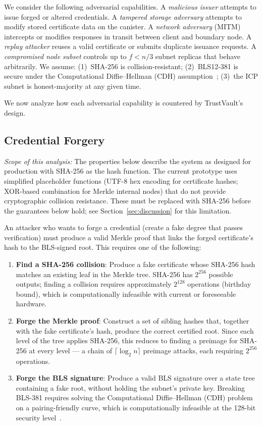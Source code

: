 \documentclass[journal]{IEEEtran}
\begin{document}
We consider the following adversarial capabilities. A \emph{malicious issuer} attempts to issue forged or altered credentials. A \emph{tampered storage adversary} attempts to modify stored certificate data on the canister. A \emph{network adversary} (MITM) intercepts or modifies responses in transit between client and boundary node. A \emph{replay attacker} reuses a valid certificate or submits duplicate issuance requests. A \emph{compromised node subset} controls up to $f < n/3$ subnet replicas that behave arbitrarily. We assume: (1)~SHA-256 is collision-resistant; (2)~BLS12-381 is secure under the Computational Diffie--Hellman (CDH) assumption~\cite{boneh2001bls}; (3)~the ICP subnet is honest-majority at any given time.

We now analyze how each adversarial capability is countered by TrustVault's design.

\subsection{Credential Forgery}

\textit{Scope of this analysis:} The properties below describe the system as designed for production with SHA-256 as the hash function. The current prototype uses simplified placeholder functions (UTF-8 hex encoding for certificate hashes; XOR-based combination for Merkle internal nodes) that do not provide cryptographic collision resistance. These must be replaced with SHA-256 before the guarantees below hold; see Section~\ref{sec:discussion} for this limitation.

An attacker who wants to forge a credential (create a fake degree that passes verification) must produce a valid Merkle proof that links the forged certificate's hash to the BLS-signed root. This requires one of the following:

\begin{enumerate}
  \item \textbf{Find a SHA-256 collision}: Produce a fake certificate whose SHA-256 hash matches an existing leaf in the Merkle tree. SHA-256 has $2^{256}$ possible outputs; finding a collision requires approximately $2^{128}$ operations (birthday bound), which is computationally infeasible with current or foreseeable hardware.
  \item \textbf{Forge the Merkle proof}: Construct a set of sibling hashes that, together with the fake certificate's hash, produce the correct certified root. Since each level of the tree applies SHA-256, this reduces to finding a preimage for SHA-256 at every level — a chain of $\lceil\log_2 n\rceil$ preimage attacks, each requiring $2^{256}$ operations.
  \item \textbf{Forge the BLS signature}: Produce a valid BLS signature over a state tree containing a fake root, without holding the subnet's private key. Breaking BLS-381 requires solving the Computational Diffie--Hellman (CDH) problem on a pairing-friendly curve, which is computationally infeasible at the 128-bit security level~\cite{boneh2001bls}.
\end{enumerate}
\end{document}
